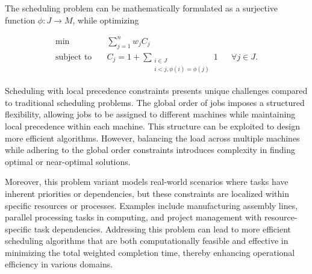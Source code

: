 \begin{definition}
    The scheduling problem can be mathematically formulated as a surjective function $ \phi: J \to M $, while optimizing

    \[
        \begin{aligned}
            \min \quad & \sum_{j=1}^n w_j C_j \\
            \text{subject to} \quad & C_j = 1 + \sum_{\substack{i \in J \\ i < j, \phi(i) = \phi(j)}} 1 && \forall j \in J.
        \end{aligned}
    \]
\end{definition}

Scheduling with local precedence constraints presents unique challenges compared to traditional scheduling problems. The global order of jobs imposes a structured flexibility, allowing jobs to be assigned to different machines while maintaining local precedence within each machine. This structure can be exploited to design more efficient algorithms. However, balancing the load across multiple machines while adhering to the global order constraints introduces complexity in finding optimal or near-optimal solutions.

Moreover, this problem variant models real-world scenarios where tasks have inherent priorities or dependencies, but these constraints are localized within specific resources or processes. Examples include manufacturing assembly lines, parallel processing tasks in computing, and project management with resource-specific task dependencies. Addressing this problem can lead to more efficient scheduling algorithms that are both computationally feasible and effective in minimizing the total weighted completion time, thereby enhancing operational efficiency in various domains.
